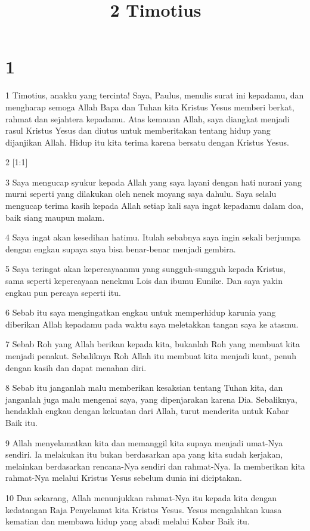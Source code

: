 

\title{2 Timotius}

\chapter{1}

\par 1 Timotius, anakku yang tercinta! Saya, Paulus, menulis surat ini kepadamu, dan mengharap semoga Allah Bapa dan Tuhan kita Kristus Yesus memberi berkat, rahmat dan sejahtera kepadamu. Atas kemauan Allah, saya diangkat menjadi rasul Kristus Yesus dan diutus untuk memberitakan tentang hidup yang dijanjikan Allah. Hidup itu kita terima karena bersatu dengan Kristus Yesus.
\par 2 [1:1]
\par 3 Saya mengucap syukur kepada Allah yang saya layani dengan hati nurani yang murni seperti yang dilakukan oleh nenek moyang saya dahulu. Saya selalu mengucap terima kasih kepada Allah setiap kali saya ingat kepadamu dalam doa, baik siang maupun malam.
\par 4 Saya ingat akan kesedihan hatimu. Itulah sebabnya saya ingin sekali berjumpa dengan engkau supaya saya bisa benar-benar menjadi gembira.
\par 5 Saya teringat akan kepercayaanmu yang sungguh-sungguh kepada Kristus, sama seperti kepercayaan nenekmu Lois dan ibumu Eunike. Dan saya yakin engkau pun percaya seperti itu.
\par 6 Sebab itu saya mengingatkan engkau untuk memperhidup karunia yang diberikan Allah kepadamu pada waktu saya meletakkan tangan saya ke atasmu.
\par 7 Sebab Roh yang Allah berikan kepada kita, bukanlah Roh yang membuat kita menjadi penakut. Sebaliknya Roh Allah itu membuat kita menjadi kuat, penuh dengan kasih dan dapat menahan diri.
\par 8 Sebab itu janganlah malu memberikan kesaksian tentang Tuhan kita, dan janganlah juga malu mengenai saya, yang dipenjarakan karena Dia. Sebaliknya, hendaklah engkau dengan kekuatan dari Allah, turut menderita untuk Kabar Baik itu.
\par 9 Allah menyelamatkan kita dan memanggil kita supaya menjadi umat-Nya sendiri. Ia melakukan itu bukan berdasarkan apa yang kita sudah kerjakan, melainkan berdasarkan rencana-Nya sendiri dan rahmat-Nya. Ia memberikan kita rahmat-Nya melalui Kristus Yesus sebelum dunia ini diciptakan.
\par 10 Dan sekarang, Allah menunjukkan rahmat-Nya itu kepada kita dengan kedatangan Raja Penyelamat kita Kristus Yesus. Yesus mengalahkan kuasa kematian dan membawa hidup yang abadi melalui Kabar Baik itu.
